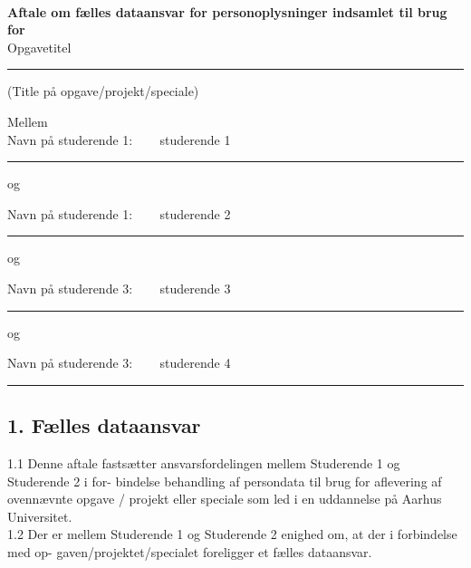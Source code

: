 \documentclass[11pt, a4paper]{article}
\newcommand{\opgavetitel}{ Opgavetitel }	 		%
\newcommand{\studerendeET}{ studerende 1 }	 		%
\newcommand{\studerendeTO}{ studerende 2 }	 		%
\newcommand{\studerendeTRE}{ studerende 3 }	 		%
\newcommand{\studerendeFIRE}{ studerende 4 }	 	%
\begin{document}
\pagestyle{fancy}
~
\vspace{1cm}

\textbf{Aftale om fælles dataansvar for personoplysninger indsamlet til brug for}~\\



\opgavetitel
\hrule
\vspace{2mm}
(Title på opgave/projekt/speciale)

\vspace{5mm}


Mellem\\ 

Navn på studerende 1: ~~~\studerendeET
\vspace{1mm}
\hrule

\vspace{5mm}

og 
\vspace{5mm}

Navn på studerende 1: ~~~\studerendeTO
\vspace{1mm}
\hrule

\vspace{5mm}

og 
\vspace{5mm}

Navn på studerende 3: ~~~\studerendeTRE
\vspace{1mm}
\hrule

\vspace{5mm}

og 
\vspace{5mm}

Navn på studerende 3: ~~~\studerendeFIRE
\vspace{1mm}
\hrule

\vspace{5mm}



\newpage
\subsection*{1. Fælles dataansvar}

1.1 Denne aftale fastsætter ansvarsfordelingen mellem Studerende 1 og Studerende 2 i for- bindelse behandling af persondata til brug for aflevering af ovennævnte opgave / projekt eller speciale som led i en uddannelse på Aarhus Universitet.\\

1.2 Der er mellem Studerende 1 og Studerende 2 enighed om, at der i forbindelse med op- gaven/projektet/specialet foreligger et fælles dataansvar.
\end{document}
